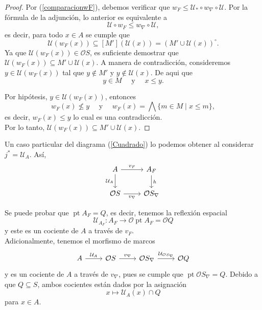 \documentclass[12pt]{article}
\DeclareMathOperator{\pt}{pt}
\begin{document}
\begin{proof}
Por (\ref{comparacionwF}), debemos verificar que $w_F\leq \mathcal{U}_*\circ w_\nabla\circ \mathcal{U}$. Por la fórmula de la adjunción,
lo anterior es equivalente a 
\[
\mathcal{U}\circ w_F\leq w_\nabla\circ \mathcal{U},
\]
es decir, para todo $x\in A$ se cumple que 
\[
\mathcal{U}(w_F(x))\subseteq [M'](\mathcal{U}(x))=(M'\cup \mathcal{U}(x))^\circ.
\]
Ya que $\mathcal{U}(w_F(x))\in \mathcal{O}S$, es suficiente demostrar que $\mathcal{U}(w_F(x))\subseteq M'\cup \mathcal{U}(x)$.
A manera de contradicción, consideremos $y\in \mathcal{U}(w_F(x))$ tal que $y\notin M'$ y $y\notin \mathcal{U}(x)$. De aqui que
\[
y\in M\quad\text{ y }\quad x\leq y.
\]

Por hipótesis, $y\in \mathcal{U}(w_F(x))$, entonces 
\[
w_F(x)\nleq y\quad \text{ y }\quad w_F(x)=\bigwedge\{m\in M\mid x\leq m\},
\]
es decir, $w_F(x)\leq y$ lo cual es una contradicción.\\ 

Por lo tanto, $\mathcal{U}(w_F(x))\subseteq M'\cup \mathcal{U}(x)$.
\end{proof}

Un caso particular del diagrama (\ref{Cuadrado}) lo podemos obtener al considerar $j^*=\mathcal{U}_A$. Así,
\[\begin{tikzcd}
	A & {A_F} \\
	{\mathcal{O}S} & {\mathcal{O}S_\nabla}
	\arrow["{v_F}", from=1-1, to=1-2]
	\arrow["{\mathcal{U}_A}"', from=1-1, to=2-1]
	\arrow["h", from=1-2, to=2-2]
	\arrow["{v_\nabla}"', from=2-1, to=2-2]
\end{tikzcd}\]

Se puede probar que $\pt A_F=Q$, es decir, tenemos la reflexión espacial
\[
\mathcal{U}_{A_F}\colon A_F\to \mathcal{O}\pt A_F=\mathcal{O}Q
\]
y este es un cociente de $A$ a través de $v_F$.\\ 

Adicionalmente, tenemos el morfismo de marcos
\[\begin{tikzcd}
	A & {\mathcal{O}S} & {\mathcal{O}S_\nabla} & {\mathcal{O}Q}
	\arrow["{\mathcal{U}_A}", from=1-1, to=1-2]
	\arrow["{v_\nabla}", from=1-2, to=1-3]
	\arrow["{\mathcal{U}_{\mathcal{O}S_\nabla}}", from=1-3, to=1-4]
\end{tikzcd}\]
y es un cociente de $A$ a través de $v_\nabla$, pues se cumple que $\pt \mathcal{O}S_\nabla=Q$. Debido a que $Q\subseteq S$, ambos cocientes están dados por la asignación
\[
x\mapsto \mathcal{U}_A(x)\cap Q
\]
para $x\in A$. 
\end{document}
